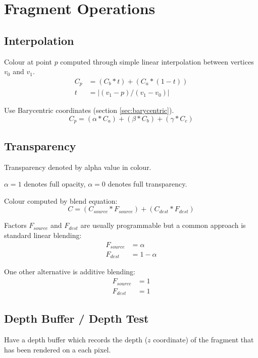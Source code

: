 \documentclass[a4paper]{article}
\begin{document}
\section{Fragment Operations}
\label{sec:fragment_operations}

\subsection{Interpolation}


Colour at point $p$ computed through simple linear interpolation between
vertices $v_{0}$ and $v_{1}$.
\begin{align*}
  C_{p} &= (C_{b} * t) + (C_{a} * (1 - t)) \\
  t &= |(v_{1} - p) / (v_{1} - v_{0})|
\end{align*}


Use Barycentric coordinates (section \ref{sec:barycentric}).
\[
  C_{p} = (\alpha * C_{a}) + (\beta * C_{b}) + (\gamma * C_{c})
\]

\subsection{Transparency}

Transparency denoted by alpha value in colour.

$\alpha = 1$ denotes full opacity, $\alpha = 0$ denotes full transparency.

Colour computed by blend equation:
\[
  C = (C_{source} * F_{source}) + (C_{dest} * F_{dest})
\]

Factors $F_{source}$ and $F_{dest}$ are usually programmable but a common
approach is standard linear blending:
\begin{align*}
  F_{source} &= \alpha \\
  F_{dest} &= 1 - \alpha
\end{align*}

One other alternative is additive blending:
\begin{align*}
  F_{source} &= 1 \\
  F_{dest} &= 1
\end{align*}

\subsection{Depth Buffer / Depth Test}

Have a depth buffer which records the depth ($z$ coordinate) of the fragment
that has been rendered on a each pixel.
\end{document}
